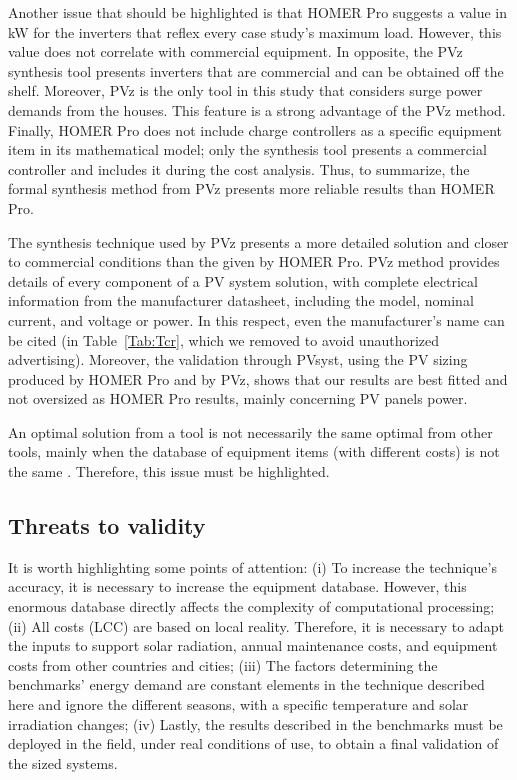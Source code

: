 \documentclass[journal]{IEEEtran}
\begin{document}
Another issue that should be highlighted is that HOMER Pro suggests a value in kW for the inverters that reflex every case study's maximum load. However, this value does not correlate with commercial equipment. In opposite, the PVz synthesis tool presents inverters that are commercial and can be obtained off the shelf. Moreover, PVz is the only tool in this study that considers surge power demands from the houses. This feature is a strong advantage of the PVz method. Finally, HOMER Pro does not include charge controllers as a specific equipment item in its mathematical model; only the synthesis tool presents a commercial controller and includes it during the cost analysis. Thus, to summarize, the formal synthesis method from PVz presents more reliable results than HOMER Pro.

The synthesis technique used by PVz presents a more detailed solution and closer to commercial conditions than the given by HOMER Pro. PVz method provides details of every component of a PV system solution, with complete electrical information from the manufacturer datasheet, including the model, nominal current, and voltage or power. In this respect, even the manufacturer's name can be cited (in Table~\ref{Tab:Tcr}, which we removed to avoid unauthorized advertising). Moreover, the validation through PVsyst, using the PV sizing produced by HOMER Pro and by PVz, shows that our results are best fitted and not oversized as HOMER Pro results, mainly concerning PV panels power.

An optimal solution from a tool is not necessarily the same optimal from other tools, mainly when the database of equipment items (with different costs) is not the same \cite{Alsadi2018}. Therefore, this issue must be highlighted. 

\subsection{Threats to validity} 

It is worth highlighting some points of attention: (i) To increase the technique's accuracy, it is necessary to increase the equipment database. However, this enormous database directly affects the complexity of computational processing; (ii) All costs (LCC) are based on local reality. Therefore, it is necessary to adapt the inputs to support solar radiation, annual maintenance costs, and equipment costs from other countries and cities; (iii) The factors determining the benchmarks' energy demand are constant elements in the technique described here and ignore the different seasons, with a specific temperature and solar irradiation changes; (iv) Lastly, the results described in the benchmarks must be deployed in the field, under real conditions of use, to obtain a final validation of the sized systems.
\end{document}

